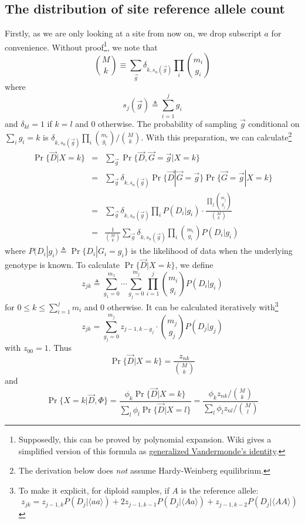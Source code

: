 \documentclass[pdftex,10pt]{book}
\begin{document}
\subsection{The distribution of site reference allele count}
Firstly, as we are only looking at a site from now on, we drop subscript
$a$ for convenience. Without proof\footnote{Supposedly, this can be
  proved by polynomial expansion. Wiki gives a simplified version of
  this formula as
  \href{http://en.wikipedia.org/wiki/Vandermonde's_identity\#Generalized_Vandermonde.27s_identity}{generalized
    Vandermonde's identity}.}, we note that
$$
\binom{M}{k}\equiv\sum_{\vec{g}}\delta_{k,s_n(\vec{g})}\prod_i\binom{m_i}{g_i}
$$
where
$$
s_j(\vec{g})\triangleq\sum_{i=1}^jg_i
$$
and $\delta_{kl}=1$ if $k=l$ and 0 otherwise. The probability of
sampling $\vec{g}$ conditional on $\sum_ig_i=k$ is
$\delta_{k,s_n(\vec{g})}\prod_i\binom{m_i}{g_i}\big/\binom{M}{k}$. With this
preparation, we can calculate\footnote{The derivation below does
  \emph{not} assume Hardy-Weinberg equilibrium.}
\begin{eqnarray*}
\Pr\{\vec{D}|X=k\}&=&\sum_{\vec{g}}\Pr\{\vec{D},\vec{G}=\vec{g}|X=k\}\\
&=&\sum_{\vec{g}}\delta_{k,s_n(\vec{g})}\Pr\{\vec{D}|\vec{G}=\vec{g}\}\Pr\{\vec{G}=\vec{g}|X=k\}\\
&=&\sum_{\vec{g}}\delta_{k,s_n(\vec{g})}\prod_iP(D_i|g_i)\cdot\frac{\prod_j\binom{m_j}{g_j}}{\binom{M}{k}}\\
&=&\frac{1}{\binom{M}{k}}\sum_{\vec{g}}\delta_{k,s_n(\vec{g})}\prod_i\binom{m_i}{g_i}P(D_i|g_i)
\end{eqnarray*}
where $P(D_i|g_i)\triangleq\Pr\{D_i|G_i=g_i\}$ is the likelihood of data
when the underlying genotype is known. To calculate
$\Pr\{\vec{D}|X=k\}$, we define
$$
z_{jk}\triangleq\sum_{g_1=0}^{m_1}\cdots\sum_{g_j=0}^{m_j}\prod_{i=1}^j\binom{m_i}{g_i}P(D_i|g_i)
$$
for $0\le k\le\sum_{i=1}^jm_i$ and 0 otherwise. It can be calculated
iteratively with\footnote{To make it explicit, for diploid samples, if
  $A$ is the reference allele:
$$
z_{jk}=z_{j-1,k}P(D_j|\langle aa\rangle)+2z_{j-1,k-1}P(D_j|\langle Aa\rangle)+z_{j-1,k-2}P(D_j|\langle AA\rangle)
$$
}
\begin{equation}\label{equ:zcal}
z_{jk}=\sum_{g_j=0}^{m_j}z_{j-1,k-g_j}\cdot\binom{m_j}{g_j}P(D_j|g_j)
\end{equation}
with $z_{00}=1$. Thus
$$
\Pr\{\vec{D}|X=k\}=\frac{z_{nk}}{\binom{M}{k}}
$$
and
\begin{equation}\label{equ:postk}
\Pr\{X=k|\vec{D},\Phi\}=\frac{\phi_k\Pr\{\vec{D}|X=k\}}{\sum_l\phi_l\Pr\{\vec{D}|X=l\}}
=\frac{\phi_kz_{nk}/\binom{M}{k}}{\sum_l\phi_lz_{nl}/\binom{M}{l}}
\end{equation}
\end{document}
